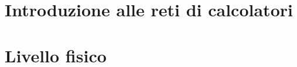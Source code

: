 \documentclass[11pt]{article}
\begin{document}
    \section{Introduzione alle reti di calcolatori}
    

    \section{Livello fisico}
    
\end{document}

